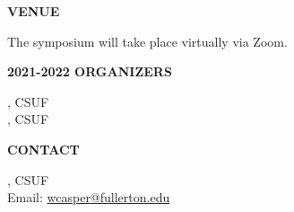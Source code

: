 \documentclass[a4paper]{article}
\begin{document}
\begin{minipage}{0.95\textwidth}
\begin{minipage}[b]{0.47\textwidth}
\medskip

\large{\color{csecondary}\textbf{VENUE}}

The symposium will take place virtually via Zoom.

\medskip
\textbf{\color{csecondary}\large 2021-2022 ORGANIZERS}\par
{}, CSUF\\
, CSUF

\medskip

\textbf{\color{csecondary}\large CONTACT }\par

, CSUF\\
Email: \href{mailto:wcasper@fullerton.edu}{wcasper@fullerton.edu}

\rule{0pt}{78pt}
\end{minipage}
\vspace*{-70pt}

\end{minipage}
\end{document}
